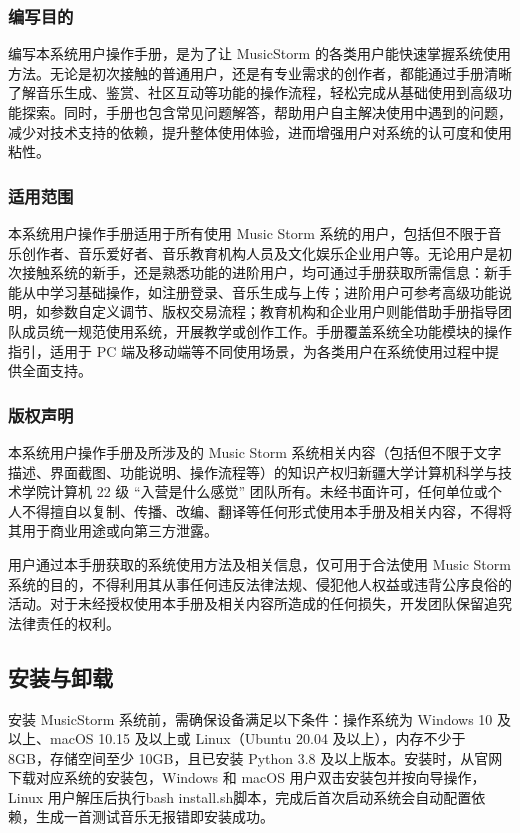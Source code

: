 \documentclass{base}
\numberwithin{figure}{section} %
\begin{document}
\subsubsection{编写目的}

编写本系统用户操作手册，是为了让 MusicStorm 的各类用户能快速掌握系统使用方法。无论是初次接触的普通用户，还是有专业需求的创作者，都能通过手册清晰了解音乐生成、鉴赏、社区互动等功能的操作流程，轻松完成从基础使用到高级功能探索。同时，手册也包含常见问题解答，帮助用户自主解决使用中遇到的问题，减少对技术支持的依赖，提升整体使用体验，进而增强用户对系统的认可度和使用粘性。

\subsubsection{适用范围}

本系统用户操作手册适用于所有使用 Music Storm 系统的用户，包括但不限于音乐创作者、音乐爱好者、音乐教育机构人员及文化娱乐企业用户等。无论用户是初次接触系统的新手，还是熟悉功能的进阶用户，均可通过手册获取所需信息：新手能从中学习基础操作，如注册登录、音乐生成与上传；进阶用户可参考高级功能说明，如参数自定义调节、版权交易流程；教育机构和企业用户则能借助手册指导团队成员统一规范使用系统，开展教学或创作工作。手册覆盖系统全功能模块的操作指引，适用于 PC 端及移动端等不同使用场景，为各类用户在系统使用过程中提供全面支持。

\subsubsection{版权声明}

本系统用户操作手册及所涉及的 Music Storm 系统相关内容（包括但不限于文字描述、界面截图、功能说明、操作流程等）的知识产权归新疆大学计算机科学与技术学院计算机 22 级 “入营是什么感觉” 团队所有。未经书面许可，任何单位或个人不得擅自以复制、传播、改编、翻译等任何形式使用本手册及相关内容，不得将其用于商业用途或向第三方泄露。

用户通过本手册获取的系统使用方法及相关信息，仅可用于合法使用 Music Storm 系统的目的，不得利用其从事任何违反法律法规、侵犯他人权益或违背公序良俗的活动。对于未经授权使用本手册及相关内容所造成的任何损失，开发团队保留追究法律责任的权利。

\subsection{安装与卸载}

安装 MusicStorm 系统前，需确保设备满足以下条件：操作系统为 Windows 10 及以上、macOS 10.15 及以上或 Linux（Ubuntu 20.04 及以上），内存不少于 8GB，存储空间至少 10GB，且已安装 Python 3.8 及以上版本。安装时，从官网下载对应系统的安装包，Windows 和 macOS 用户双击安装包并按向导操作，Linux 用户解压后执行bash install.sh脚本，完成后首次启动系统会自动配置依赖，生成一首测试音乐无报错即安装成功。
\end{document}
